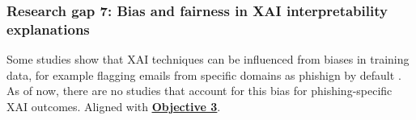 
\subsubsection*{Research gap 7: Bias and fairness in XAI interpretability explanations}\label{research-gap-7}
Some studies show that XAI techniques can be influenced from biases in training data, for example flagging emails from specific domains as phishign by default \citep{hanif2021survey}. As of now, there are no studies that account for this bias for phishing-specific XAI outcomes. Aligned with \hyperref[objective-3]{\uline{\textbf{Objective 3}}}.

